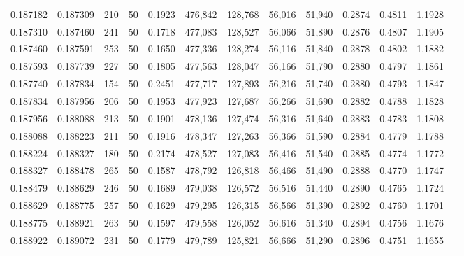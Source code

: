 \begin{tabular}{rrrrrrrrrrrrr}
0.187182 & 0.187309 &   210 &  50 &                                     0.1923 & 476,842 & 128,768 &  56,016 &  51,940 & 0.2874 & 0.4811 & 1.1928 \\
0.187310 & 0.187460 &   241 &  50 &                                     0.1718 & 477,083 & 128,527 &  56,066 &  51,890 & 0.2876 & 0.4807 & 1.1905 \\
0.187460 & 0.187591 &   253 &  50 &                                     0.1650 & 477,336 & 128,274 &  56,116 &  51,840 & 0.2878 & 0.4802 & 1.1882 \\
0.187593 & 0.187739 &   227 &  50 &                                     0.1805 & 477,563 & 128,047 &  56,166 &  51,790 & 0.2880 & 0.4797 & 1.1861 \\
0.187740 & 0.187834 &   154 &  50 &                                     0.2451 & 477,717 & 127,893 &  56,216 &  51,740 & 0.2880 & 0.4793 & 1.1847 \\
0.187834 & 0.187956 &   206 &  50 &                                     0.1953 & 477,923 & 127,687 &  56,266 &  51,690 & 0.2882 & 0.4788 & 1.1828 \\
0.187956 & 0.188088 &   213 &  50 &                                     0.1901 & 478,136 & 127,474 &  56,316 &  51,640 & 0.2883 & 0.4783 & 1.1808 \\
0.188088 & 0.188223 &   211 &  50 &                                     0.1916 & 478,347 & 127,263 &  56,366 &  51,590 & 0.2884 & 0.4779 & 1.1788 \\
0.188224 & 0.188327 &   180 &  50 &                                     0.2174 & 478,527 & 127,083 &  56,416 &  51,540 & 0.2885 & 0.4774 & 1.1772 \\
0.188327 & 0.188478 &   265 &  50 &                                     0.1587 & 478,792 & 126,818 &  56,466 &  51,490 & 0.2888 & 0.4770 & 1.1747 \\
0.188479 & 0.188629 &   246 &  50 &                                     0.1689 & 479,038 & 126,572 &  56,516 &  51,440 & 0.2890 & 0.4765 & 1.1724 \\
0.188629 & 0.188775 &   257 &  50 &                                     0.1629 & 479,295 & 126,315 &  56,566 &  51,390 & 0.2892 & 0.4760 & 1.1701 \\
0.188775 & 0.188921 &   263 &  50 &                                     0.1597 & 479,558 & 126,052 &  56,616 &  51,340 & 0.2894 & 0.4756 & 1.1676 \\
0.188922 & 0.189072 &   231 &  50 &                                     0.1779 & 479,789 & 125,821 &  56,666 &  51,290 & 0.2896 & 0.4751 & 1.1655 \\

\end{tabular}
